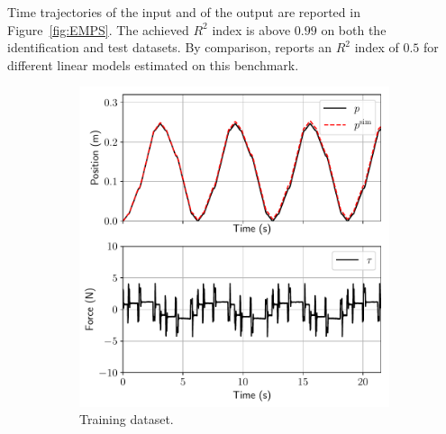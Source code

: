 \documentclass{article} %
\begin{document}
Time trajectories of the input and of the output  are reported in Figure~\ref{fig:EMPS}.
The achieved $R^2$ index is above $0.99$ on both the identification and test datasets. By comparison, \cite{janot2019data} reports an $R^2$ index of $0.5$ for different linear models
estimated on this benchmark. 

 \begin{figure}
 \begin{subfigure}{.5\textwidth}
   \centering
   \includegraphics[width=\linewidth]{fig/EMPS/EMPS_SS_id_model_SS_64step_RK.pdf}
   \caption{Training dataset.}
   \label{fig:sub1}
 \end{subfigure}%
 \begin{subfigure}{.5\textwidth}
   \centering

\end{subfigure}
\end{figure}
\end{document}
